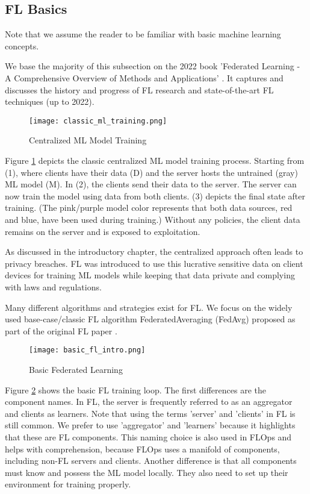 
\subsection{FL Basics}

Note that we assume the reader to be familiar with basic machine learning concepts.

We base the majority of this subsection on the 2022 book
'Federated Learning - A Comprehensive Overview of Methods and Applications' \cite{book:fl}.
It captures and discusses the history and progress of FL research and state-of-the-art FL techniques (up to 2022).

\begin{figure}[h]
    \centering
    \texttt{[image: classic\_ml\_training.png]}
    \caption{Centralized ML Model Training}
    \label{fig:classic_ml_training}
\end{figure}
Figure \ref{fig:classic_ml_training} depicts the classic centralized ML model training process.
Starting from (1), where clients have their data (D) and
the server hosts the untrained (gray) ML model (M).
In (2), the clients send their data to the server.
The server can now train the model using data from both clients.
(3) depicts the final state after training.
(The pink/purple model color represents that both data sources, red and blue,
have been used during training.)
Without any policies, the client data remains on the server and is exposed
to exploitation.

As discussed in the introductory chapter, the centralized approach often leads to
privacy breaches. FL was introduced to use this lucrative sensitive data
on client devices for training ML models while keeping that data private and 
complying with laws and regulations.

Many different algorithms and strategies exist for FL.
We focus on the widely used base-case/classic FL algorithm FederatedAveraging (FedAvg)
proposed as part of the original FL paper \cite{paper:original_fl}.

\begin{figure}%
    \centering
    \texttt{[image: basic\_fl\_intro.png]}
    \caption{Basic Federated Learning}
    \label{fig:basic_fl_intro}
\end{figure}
Figure \ref{fig:basic_fl_intro} shows the basic FL training loop.
The first differences are the component names.
In FL, the server is frequently referred to as an aggregator
and clients as learners.
Note that using the terms 'server' and 'clients' in FL is still common.
We prefer to use 'aggregator' and 'learners' because it highlights that these are FL components.
This naming choice is also used in FLOps and helps with comprehension,
because FLOps uses a manifold of components, including non-FL servers and clients.
Another difference is that all components must know and possess the ML model locally.
They also need to set up their environment for training properly.

